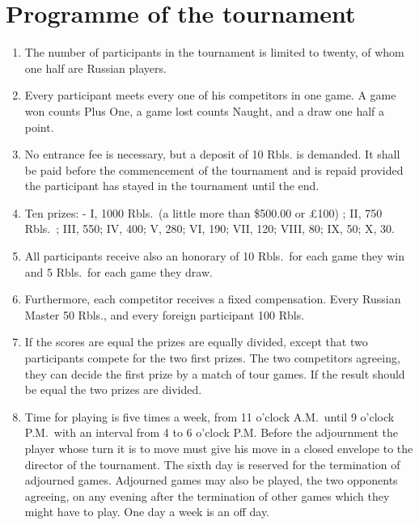 \chapter{Programme of the tournament}

\begin{enumerate}
\item The number of participants in the tournament is limited to twenty, of whom one half are Russian players.

\item Every participant meets every one of his competitors in one game. A game won counts Plus One, a game lost counts Naught, and a draw one half a point.

\item No entrance fee is necessary, but a deposit of 10 Rbls. is demanded. It shall be paid before the commencement of the tournament and is repaid provided the participant has stayed in the tournament until the end.

\item Ten prizes: - I, 1000 Rbls.~(a little more than \$500.00 or \pounds 100) ; II, 750 Rbls.~; III, 550; IV, 400; V, 280; VI, 190; VII, 120; VIII, 80; IX, 50; X, 30.

\item All participants receive also an honorary of 10 Rbls.~for each game they win and 5 Rbls.~for each game they draw.

\item Furthermore, each competitor receives a fixed compensation. Every Russian Master 50 Rbls., and every foreign participant 100 Rbls.

\item If the scores are equal the prizes are equally divided, except that two participants compete for the two first prizes. The two competitors agreeing, they can decide the first prize by a match of tour games. If the result should be equal the two prizes are divided.

\item Time for playing is five times a week, from 11 o'clock A.M.~until 9 o'clock P.M.~with an interval from 4 to 6 o'clock P.M. Before the adjournment the player whose turn it is to move must give his move in a closed envelope to the director of the tournament. The sixth day is reserved for the termination of adjourned games. Adjourned games may also be played, the two opponents agreeing, on any evening after the termination of other games which they might have to play. One day a week is an off day.


\end{enumerate}
